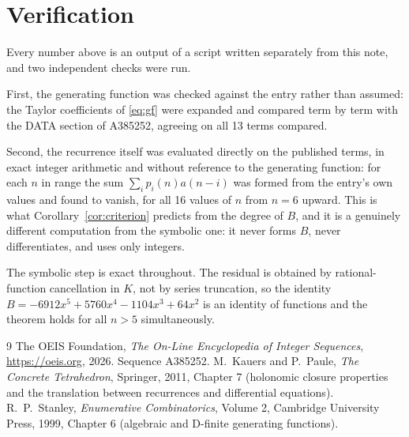 \documentclass[11pt,a4paper]{article}
\theoremstyle{plain}
\theoremstyle{definition}
\begin{document}
\section{Verification}

Every number above is an output of a script written separately from this note, and two
independent checks were run.

First, the generating function was checked against the entry rather than assumed: the
Taylor coefficients of \eqref{eq:gf} were expanded and compared term by term with the DATA
section of A385252, agreeing on all 13 terms compared.

Second, the recurrence itself was evaluated directly on the published terms, in exact
integer arithmetic and without reference to the generating function: for each $n$ in range
the sum $\sum_{i}p_{i}(n)a(n-i)$ was formed from the entry's own values and found to
vanish, for all 16 values of $n$ from $n=6$ upward. This is what
Corollary~\ref{cor:criterion} predicts from the degree of $B$, and it is a genuinely
different computation from the symbolic one: it never forms $B$, never differentiates, and
uses only integers.

The symbolic step is exact throughout. The residual is obtained by rational-function
cancellation in $K$, not by series truncation, so the identity $B=- 6912 x^{5} + 5760 x^{4} - 1104 x^{3} + 64 x^{2}$ is an
identity of functions and the theorem holds for all $n>5$ simultaneously.

\begin{thebibliography}{9}
 The OEIS Foundation, \emph{The On-Line Encyclopedia of Integer Sequences},
\url{https://oeis.org}, 2026. Sequence A385252.
 M.~Kauers and P.~Paule, \emph{The Concrete Tetrahedron}, Springer, 2011,
Chapter 7 (holonomic closure properties and the translation between recurrences and
differential equations).
 R.~P.~Stanley, \emph{Enumerative Combinatorics}, Volume 2, Cambridge
University Press, 1999, Chapter 6 (algebraic and D-finite generating functions).
\end{thebibliography}
\end{document}
